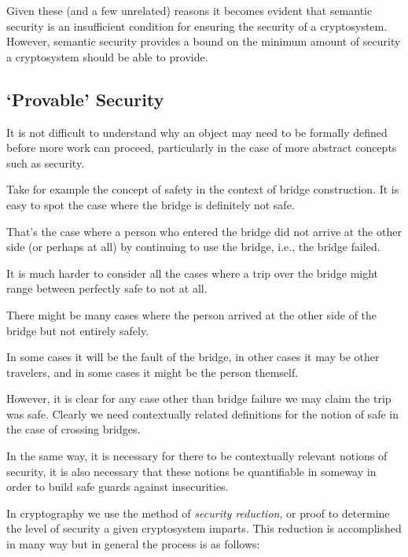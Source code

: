 Given these (and a few unrelated) reasons it becomes evident that semantic security is an insufficient condition for ensuring the security of a cryptosystem. 
However, semantic security provides a bound on the minimum amount of security a cryptosystem should be able to provide. 


\bigskip

\subsection{`Provable' Security} 


It is not difficult to understand why an object may need to be formally defined before more work can proceed, particularly in the case of more abstract concepts such as security.

\medskip

\begin{exmp}
    Take for example the concept of safety in the context of bridge construction. It is easy to spot the case where the bridge is definitely not safe. 
    
    That's the case where a person who entered the bridge did not arrive at the other side (or perhaps at all) by continuing to use the bridge, i.e., the bridge failed. 
    
    It is much harder to consider all the cases where a trip over the bridge might range between perfectly safe to not at all. 
    
    There might be many cases where the person arrived at the other side of the bridge but not entirely safely.
    
    In some cases it will be the fault of the bridge, in other cases it may be other travelers, and in some cases it might be the person themself.
    
    However, it is clear for any case other than bridge failure we may claim the trip was safe. Clearly we need contextually related definitions for the notion of safe in the case of crossing bridges.
\end{exmp}


\bigskip

In the same way, it is necessary for there to be contextually relevant notions of security, it is also necessary that these notions be quantifiable in someway in order to build safe guards against insecurities. 

\medskip

In cryptography we use the method of \emph{security reduction}, or proof to determine the level of security a given cryptosystem imparts. This reduction is accomplished in many way but in general the process is as follows:
\smallskip

